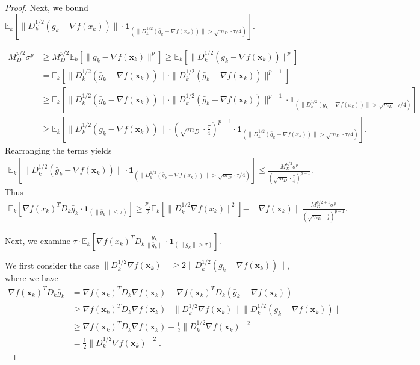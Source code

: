 \documentclass{article}
\newcommand{\bx}{\boldsymbol{x}}
\newcommand{\barg}{\bar{g}}
\theoremstyle{plain}
\theoremstyle{definition}
\theoremstyle{remark}
\begin{document}
\begin{proof}
Next, we bound $\mathbb{E}_k[\|D_k^{1/2} (\bar{g}_k - \nabla f(x_k))\| \cdot \boldsymbol{1}_{(\|D_k^{1/2}(\bar{g}_k - \nabla f(x_k))\|> \sqrt{m_D}\cdot\tau/4)}]$.

\begin{align*}
    M_D^{p/2} \sigma^p & \geq M_D^{p/2}\mathbb{E}_k[\|\barg_k-\nabla f(\bx_k)\|^p]\geq \mathbb{E}_k[\|D_k^{1/2}(\barg_k-\nabla f(\bx_k))\|^p] \\
    & = \mathbb{E}_k[\|D_k^{1/2}(\barg_k-\nabla f(\bx_k))\| \cdot \|D_k^{1/2}(\barg_k-\nabla f(\bx_k))\|^{p-1}] \\
    & \geq \mathbb{E}_k[\|D_k^{1/2}(\barg_k-\nabla f(\bx_k))\| \cdot \|D_k^{1/2}(\barg_k-\nabla f(\bx_k))\|^{p-1}\cdot \boldsymbol{1}_{(\|D_k^{1/2}(\bar{g}_k - \nabla f(x_k))\|> \sqrt{m_D}\cdot\tau/4)}] \\
    & \geq \mathbb{E}_k[\|D_k^{1/2}(\barg_k-\nabla f(\bx_k))\| \cdot \left(\sqrt{m_D}\cdot\frac{\tau}{4}\right)^{p-1}\cdot \boldsymbol{1}_{(\|D_k^{1/2}(\bar{g}_k - \nabla f(x_k))\|> \sqrt{m_D}\cdot\tau/4)}].
\end{align*}
Rearranging the terms yields
\begin{align*}
    \mathbb{E}_k[\|D_k^{1/2}(\barg_k-\nabla f(\bx_k))\|  \cdot \boldsymbol{1}_{(\|D_k^{1/2}(\bar{g}_k - \nabla f(x_k))\|> \sqrt{m_D}\cdot\tau/4)}] \leq \frac{M_D^{p/2} \sigma^p}{\left(\sqrt{m_D}\cdot\frac{\tau}{4}\right)^{p-1}}.
\end{align*}
Thus
\begin{align*}
    \mathbb{E}_k[\nabla f(x_k)^T D_k \bar{g}_k \cdot \boldsymbol{1}_{(\|\bar{g}_k\| \le \tau)}]
    \geq \frac{p_g}{2}\mathbb{E}_k[\| D_k^{1/2} \nabla f(x_k)\|^2] -  \|\nabla f(\bx_k)\|\frac{M_D^{p/2+1} \sigma^p}{\left(\sqrt{m_D}\cdot\frac{\tau}{4}\right)^{p-1}} .
\end{align*}

Next, we examine $\tau \cdot \mathbb{E}_k\left[\nabla f(x_k)^T D_k \frac{\bar{g}_k}{\|\bar{g}_k\|} \cdot \boldsymbol{1}_{(\|\bar{g}_k\| > \tau)} \right]$.

We first consider the case $\|D_k^{1/2}\nabla f(\bx_k)\|\geq 2\|D_k^{1/2}(\barg_k-\nabla f(\bx_k))\|$, where we have
\begin{align*}
    \nabla f(\bx_k)^TD_k\barg_k 
    &= \nabla f(\bx_k)^TD_k\nabla f(\bx_k) +\nabla f(\bx_k)^TD_k (\barg_k - \nabla f(\bx_k)) \\
    & \geq \nabla f(\bx_k)^TD_k\nabla f(\bx_k) - \|D_k^{1/2}\nabla f(\bx_k)\|\|D_k^{1/2} (\barg_k - \nabla f(\bx_k))\| \\
    & \geq \nabla f(\bx_k)^TD_k\nabla f(\bx_k) - \frac{1}{2}\|D_k^{1/2}\nabla f(\bx_k)\|^2 \\
    & = \frac{1}{2}\|D_k^{1/2}\nabla f(\bx_k)\|^2.
\end{align*}


\end{proof}
\end{document}
